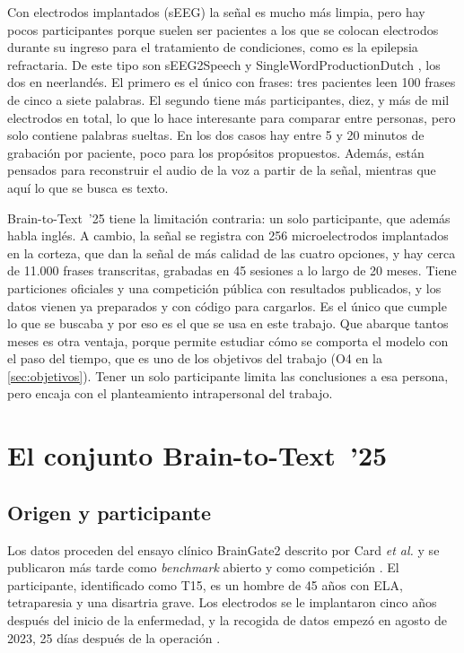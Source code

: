 Con electrodos implantados (sEEG) la señal es mucho más limpia, pero hay pocos participantes porque suelen ser pacientes a los que se colocan electrodos durante su ingreso para el tratamiento de condiciones, como es la epilepsia refractaria. De este tipo son sEEG2Speech \cite{kohler2022} y SingleWordProductionDutch \cite{verwoert2022}, los dos en neerlandés. El primero es el único con frases: tres pacientes leen 100 frases de cinco a siete palabras. El segundo tiene más participantes, diez, y más de mil electrodos en total, lo que lo hace interesante para comparar entre personas, pero solo contiene palabras sueltas. En los dos casos hay entre 5 y 20 minutos de grabación por paciente, poco para los propósitos propuestos. Además, están pensados para reconstruir el audio de la voz a partir de la señal, mientras que aquí lo que se busca es texto.

Brain-to-Text~'25 \cite{card2024,b2t25} tiene la limitación contraria: un solo participante, que además habla inglés. A cambio, la señal se registra con 256 microelectrodos implantados en la corteza, que dan la señal de más calidad de las cuatro opciones, y hay cerca de 11.000 frases transcritas, grabadas en 45 sesiones a lo largo de 20 meses. Tiene particiones oficiales y una competición pública con resultados publicados, y los datos vienen ya preparados y con código para cargarlos. Es el único que cumple lo que se buscaba y por eso es el que se usa en este trabajo. Que abarque tantos meses es otra ventaja, porque permite estudiar cómo se comporta el modelo con el paso del tiempo, que es uno de los objetivos del trabajo (O4 en la \cref{sec:objetivos}). Tener un solo participante limita las conclusiones a esa persona, pero encaja con el planteamiento intrapersonal del trabajo.

\section{El conjunto Brain-to-Text~'25}
\label{sec:b2t25}

\subsection{Origen y participante}

Los datos proceden del ensayo clínico BrainGate2 descrito por Card \textit{et al.} \cite{card2024} y se publicaron más tarde como \textit{benchmark} abierto y como competición \cite{b2t25}. El participante, identificado como T15, es un hombre de 45 años con ELA, tetraparesia y una disartria grave. Los electrodos se le implantaron cinco años después del inicio de la enfermedad, y la recogida de datos empezó en agosto de 2023, 25 días después de la operación \cite{card2024}.

